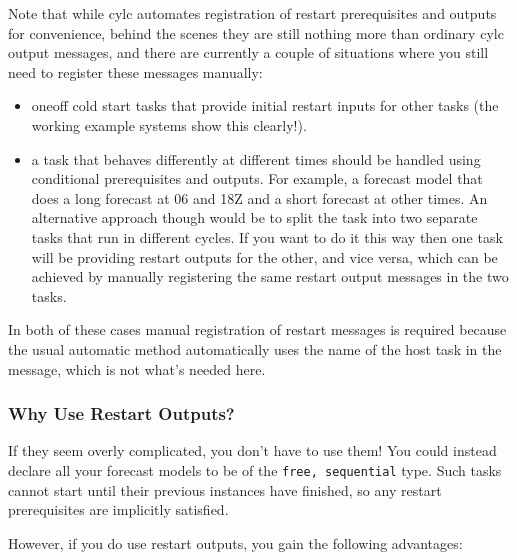 \documentclass[11pt,a4paper]{article}
\begin{document}
Note that while cylc automates registration of restart prerequisites and 
outputs for convenience, behind the scenes they are still nothing more
than ordinary cylc output messages, and there are currently a couple
of situations where you still need to register these messages manually:

\begin{itemize}

    \item oneoff cold start tasks that provide initial restart inputs
        for other tasks (the working example systems show this clearly!).

    \item a task that behaves differently at different times should be 
        handled using conditional prerequisites and outputs. For
        example, a forecast model that does a long forecast at 06 and
        18Z and a short forecast at other times. An alternative approach
        though would be to split the task into two separate tasks that 
        run in different cycles. If you want to do it this way then one
        task will be providing restart outputs for the other, and vice
        versa, which can be achieved by manually registering the same
        restart output messages in the two tasks. 

\end{itemize}

In both of these cases manual registration of restart messages is
required because the usual automatic method automatically uses the name
of the host task in the message, which is not what's needed here.


\subsubsection{Why Use Restart Outputs?}

If they seem overly complicated, you don't have to use them! You could
instead declare all your forecast models to be of the  
\lstinline=free, sequential= type. Such tasks cannot start until their
previous instances have finished, so any restart prerequisites are
implicitly satisfied.

However, if you do use restart outputs, you gain the following advantages:
\end{document}

